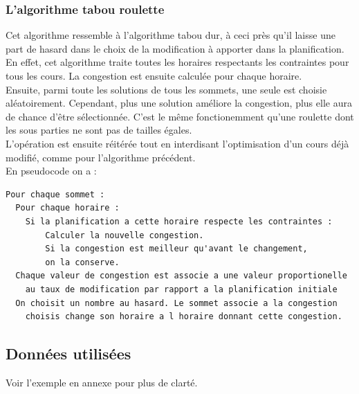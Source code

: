 \documentclass[a4paper,11pt]{article}
\begin{document}
		\subsubsection{L'algorithme tabou roulette}
			Cet algorithme ressemble à l'algorithme tabou dur, à ceci près qu'il laisse une part de hasard dans le choix de la modification à apporter dans la planification.\\
			En effet, cet algorithme traite toutes les horaires respectants les contraintes pour tous les cours. La congestion est ensuite calculée pour chaque horaire.\\
			Ensuite, parmi toute les solutions de tous les sommets, une seule est choisie aléatoirement. Cependant, plus une solution améliore la congestion, plus elle aura de chance d'être sélectionnée. C'est le même fonctionemment qu'une roulette dont les sous parties ne sont pas de tailles égales.\\
			L'opération est ensuite réitérée tout en interdisant l'optimisation d'un cours déjà modifié, comme pour l'algorithme précédent.\\
			En pseudocode on a :\\
\begin{lstlisting}
Pour chaque sommet :
  Pour chaque horaire :
  	Si la planification a cette horaire respecte les contraintes :
    	Calculer la nouvelle congestion.
    	Si la congestion est meilleur qu'avant le changement,
      	on la conserve.
  Chaque valeur de congestion est associe a une valeur proportionelle 
  	au taux de modification par rapport a la planification initiale
  On choisit un nombre au hasard. Le sommet associe a la congestion 
  	choisis change son horaire a l horaire donnant cette congestion.
  \end{lstlisting}
	
	\subsection{Données utilisées}
		Voir l'exemple en annexe pour plus de clarté.
\end{document}
